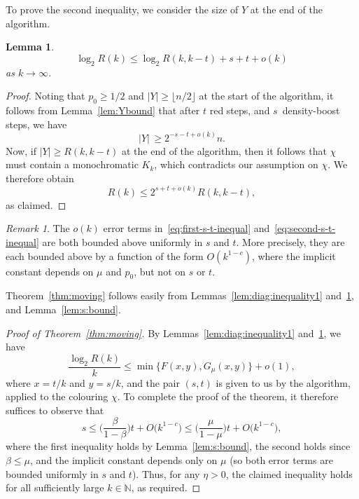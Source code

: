 \documentclass[12pt,reqno]{amsart}
\newtheorem{lemma}[theorem]{Lemma}
\theoremstyle{definition}
\theoremstyle{remark}
\newtheorem{remark}[theorem]{Remark}
\newcommand\N{\mathbb{N}}
\renewcommand{\le}{\leqslant}
\renewcommand{\ge}{\geqslant}
\renewcommand{\to}{\rightarrow}
\def\N{\mathbb{N}}
\begin{document}
To prove the second inequality, we consider the size of $Y$ at the end of the algorithm.  

\begin{lemma}\label{lem:diag:inequality2} 
\begin{equation}\label{eq:second-s-t-inequal}
\log_2 R(k) \le \log_2 R(k,k-t) + s + t + o(k)
\end{equation}
as $k \to \infty$.
\end{lemma}

\begin{proof}
Noting that $p_0 \ge 1/2$ and $|Y| \ge \lfloor n/2 \rfloor$ at the start of the algorithm, it follows from Lemma~\ref{lem:Ybound} that after $t$ red steps, and $s$~density-boost steps, we have
$$|Y|  \, \ge 2^{ - s - t + o(k)} n.$$
Now, if $|Y| \ge R(k,k-t)$ at the end of the algorithm, then it follows that $\chi$ must contain a monochromatic $K_k$, which contradicts our assumption on $\chi$. We therefore obtain 
$$R(k) \le 2^{ s + t + o(k)} R(k,k-t),$$
as claimed.
\end{proof}

\begin{remark}
The $o(k)$ error terms in~\eqref{eq:first-s-t-inequal} and~\eqref{eq:second-s-t-inequal} are both bounded above uniformly in $s$ and $t$. More precisely, they are each bounded above by a function of the form $O(k^{1-c})$, where the implicit constant depends on $\mu$ and $p_0$, but not on $s$ or $t$. 
\end{remark}

Theorem~\ref{thm:moving} follows easily from Lemmas~\ref{lem:diag:inequality1} and~\ref{lem:diag:inequality2}, and Lemma~\ref{lem:s:bound}.

\begin{proof}[Proof of Theorem~\ref{thm:moving}]
By Lemmas~\ref{lem:diag:inequality1} and~\ref{lem:diag:inequality2}, we have 
$$\frac{\log_2 R(k)}{k} \le \min \big\{ F(x,y), G_\mu(x,y) \big\} + o(1),$$
where $x = t/k$ and $y = s/k$, and the pair $(s,t)$ is given to us by the algorithm, applied to the colouring $\chi$. To complete the proof of the theorem, it therefore suffices to observe that 
$$s \le \bigg( \frac{\beta}{1 - \beta} \bigg) t + O\big( k^{1-c} \big) \le \bigg( \frac{\mu}{1 - \mu} \bigg) t + O\big( k^{1-c} \big),$$ %
where the first inequality holds by Lemma~\ref{lem:s:bound}, the second holds since $\beta \le \mu$, and the implicit constant depends only on $\mu$ (so both error terms are bounded uniformly in $s$ and $t$). Thus, for any $\eta > 0$, the claimed inequality holds for all sufficiently large $k \in \N$, as required.
\end{proof}
\end{document}
